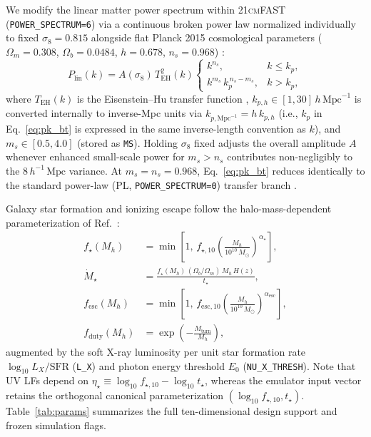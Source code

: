 \documentclass[aps,prd,reprint,superscriptaddress,nofootinbib,amsmath,amssymb,floatfix,longbibliography]{revtex4-2}
\begin{document}
We modify the linear matter power spectrum within \textsc{21cmFAST} (\texttt{POWER\_SPECTRUM=6}) via a continuous broken power law normalized individually to fixed $\sigma_8 = 0.815$ alongside flat Planck 2015 cosmological parameters ($\Omega_m = 0.308$, $\Omega_b = 0.0484$, $h = 0.678$, $n_s = 0.968$) \cite{Planck2015,Eisenstein1998}:
\begin{equation}
P_{\mathrm{lin}}(k) = A(\sigma_8)\,T_{\mathrm{EH}}^2(k)
\begin{cases}
k^{n_s}, & k \le k_p,\\
k^{m_s}\,k_p^{\,n_s - m_s}, & k > k_p,
\end{cases}
\label{eq:pk_bt}
\end{equation}
where $T_{\mathrm{EH}}(k)$ is the Eisenstein--Hu transfer function \cite{Eisenstein1998}, $k_{p,h} \in [1, 30]\,h\,\mathrm{Mpc}^{-1}$ is converted internally to inverse-Mpc units via $k_{p,\mathrm{Mpc}^{-1}} = h\,k_{p,h}$ (i.e., $k_p$ in Eq.~\eqref{eq:pk_bt} is expressed in the same inverse-length convention as $k$), and $m_s \in [0.5, 4.0]$ (stored as \texttt{MS}). Holding $\sigma_8$ fixed adjusts the overall amplitude $A$ whenever enhanced small-scale power for $m_s > n_s$ contributes non-negligibly to the $8\,h^{-1}\,\mathrm{Mpc}$ variance. At $m_s = n_s = 0.968$, Eq.~\eqref{eq:pk_bt} reduces identically to the standard power-law (PL, \texttt{POWER\_SPECTRUM=0}) transfer branch \cite{Murray2020}.

Galaxy star formation and ionizing escape follow the halo-mass-dependent parameterization of Ref.~\cite{Park2019}:
\begin{align}
f_\star(M_h) &= \min\!\left[1,\, f_{\star,10}\left(\frac{M_h}{10^{10}\,M_\odot}\right)^{\alpha_\star}\right],\\
\dot{M}_\star &= \frac{f_\star(M_h)\,(\Omega_b/\Omega_m)\,M_h\,H(z)}{t_\star},\\
f_{\mathrm{esc}}(M_h) &= \min\!\left[1,\, f_{\mathrm{esc},10}\left(\frac{M_h}{10^{10}\,M_\odot}\right)^{\alpha_{\mathrm{esc}}}\right],\\
f_{\mathrm{duty}}(M_h) &= \exp\!\left(-\frac{M_{\mathrm{turn}}}{M_h}\right),
\end{align}
augmented by the soft X-ray luminosity per unit star formation rate $\log_{10} L_X/\mathrm{SFR}$ (\texttt{L\_X}) and photon energy threshold $E_0$ (\texttt{NU\_X\_THRESH}). Note that UV LFs depend on $\eta_\star \equiv \log_{10} f_{\star,10} - \log_{10} t_\star$, whereas the emulator input vector retains the orthogonal canonical parameterization $( \log_{10} f_{\star,10}, t_\star )$. Table~\ref{tab:params} summarizes the full ten-dimensional design support and frozen simulation flags.
\end{document}
